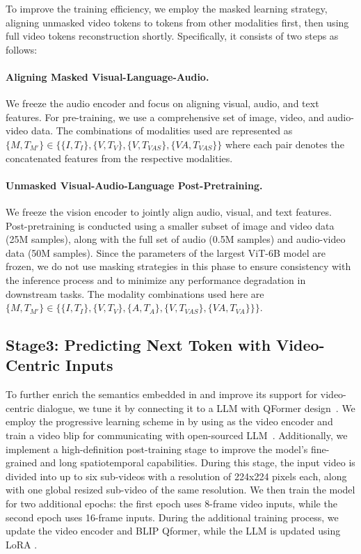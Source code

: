 To improve the training efficiency, we employ the masked learning strategy, aligning unmasked video tokens to tokens from other modalities first, then using full video tokens reconstruction shortly. Specifically, it consists of two steps as follows:

\paragraph{Aligning Masked Visual-Language-Audio.}
We freeze the audio encoder and focus on aligning visual, audio, and text features. For pre-training, we use a comprehensive set of image, video, and audio-video data. The combinations of modalities used are represented as $\{M, T_{M'}\} \in \{ \{I, T_I\}, \{V, T_V\}, \{V, T_\textit{VAS}\}, \{\textit{VA}, T_\textit{VAS}\}\}$ where each pair denotes the concatenated features from the respective modalities.

\paragraph{Unmasked Visual-Audio-Language Post-Pretraining.}
We freeze the vision encoder to jointly align audio, visual, and text features. Post-pretraining is conducted using a smaller subset of image and video data (25M samples), along with the full set of audio (0.5M samples) and audio-video data (50M samples). Since the parameters of the largest ViT-6B model are frozen, we do not use masking strategies in this phase to ensure consistency with the inference process and to minimize any performance degradation in downstream tasks. The modality combinations used here are $\{M, T_{M'}\} \in \{ \{I, T_I\}, \{V, T_V\}, \{A, T_{A}\}, \{V, T_\textit{VAS}\}, \{\textit{VA}, T_\textit{VA}\}\}\}$.

\subsection{Stage3: Predicting Next Token with Video-Centric Inputs}
To further enrich the semantics embedded in {\modelname} and improve its support for video-centric dialogue, we tune it by connecting it to a LLM with QFormer design~\cite{blip2,blip}. We employ the progressive learning scheme in \cite{li2023mvbench} by using \modelname{} as the video encoder and train a video blip for communicating with open-sourced LLM~\cite{vicuna,mistral}. 
Additionally, we implement a high-definition post-training stage to improve the model's fine-grained and long spatiotemporal capabilities. During this stage, the input video is divided into up to six sub-videos with a resolution of 224x224 pixels each, along with one global resized sub-video of the same resolution. We then train the model for two additional epochs: the first epoch uses 8-frame video inputs, while the second epoch uses 16-frame inputs.
During the additional training process, we update the video encoder and BLIP Qformer, while the LLM is updated using LoRA \cite{lora}.

